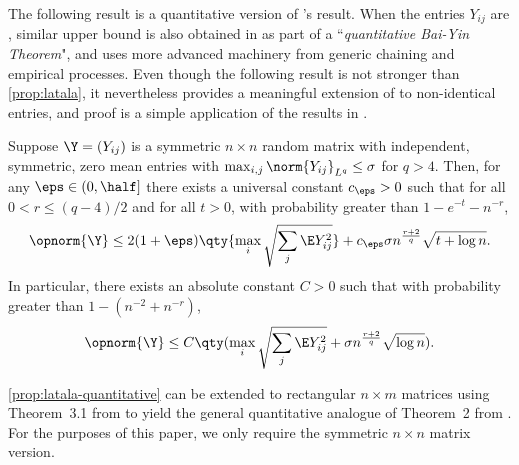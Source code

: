 \documentclass[10pt]{article}
\begin{document}
The following result is a quantitative version of \citeauthor{latala2005some}'s result. When the entries $Y_{ij}$ are \iid{}, similar upper bound is also obtained in \cite{mendelson2012generic} as part of a ``\textit{quantitative Bai-Yin Theorem}", and uses more advanced machinery from generic chaining and empirical processes. Even though the following result is not stronger than \cref{prop:latala}, it nevertheless provides a meaningful extension of \cite{mendelson2012generic} to non-identical entries, and proof is a simple application of the results in \cite{bandeira2016sharp}.

\begin{proposition}\label{prop:latala-quantitative}
    Suppose $\Y = (Y_{ij})$ is a symmetric $n \times n$ random matrix with independent, symmetric, zero mean entries with $\max_{i,j}\norm{Y_{ij}}_{L^q} \le \sigma$ for $q > 4$. Then, for any $\eps \in (0, \half]$ there exists a universal constant $c_\eps > 0$ such that for all $0 < r \le (q-4)/2$ and for all $t > 0$, with probability greater than $1 - e^{-t} - n^{-r}$,
    \begin{align}
        \opnorm{\Y} \le 2(1+\eps) \qty{\max_{i}\sqrt{\sum_{j}\E Y_{ij}^2}} + c_\eps \sigma n^{\frac{r+2}{q}} \sqrt{t + \log{n}}.\label{eq:latala-quantitative-1}
    \end{align}
    In particular, there exists an absolute constant $C > 0$ such that with probability greater than $1 - (n^{-2} + n^{-r})$,
    \begin{align}
        \opnorm{\Y} \le C \qty({\max_{i}\sqrt{\sum_{j}\E Y_{ij}^2}} + \sigma n^{\frac{r+2}{q}}\sqrt{\log{n}}).\label{eq:latala-quantitative-2}
    \end{align}
\end{proposition}

\begin{remark}
    \cref{prop:latala-quantitative} can be extended to rectangular $n\times m$ matrices using Theorem~3.1 from \cite{bandeira2016sharp} to yield the general quantitative analogue of Theorem~2 from \cite{latala2005some}. For the purposes of this paper, we only require the symmetric $n\times n$ matrix version.
\end{remark}
\end{document}
